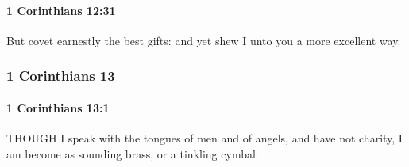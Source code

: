 		\paragraph{1 Corinthians 12:31} %
			\label{1CORINTHIANS-12-31}

			But covet earnestly the best gifts: and yet shew I unto you a more excellent way.

			\begin{framed}
				\scriptsize
				\begin{compactdesc}
					\item[SBLG] 
				\end{compactdesc}
			\end{framed}

	\subsubsection{1 Corinthians 13}
		\label{1CORINTHIANS-13}
		
		\paragraph{1 Corinthians 13:1} %
			\label{1CORINTHIANS-13-1}

			THOUGH I speak with the tongues of men and of angels, and have not charity, I am become as sounding brass, or a tinkling cymbal.

